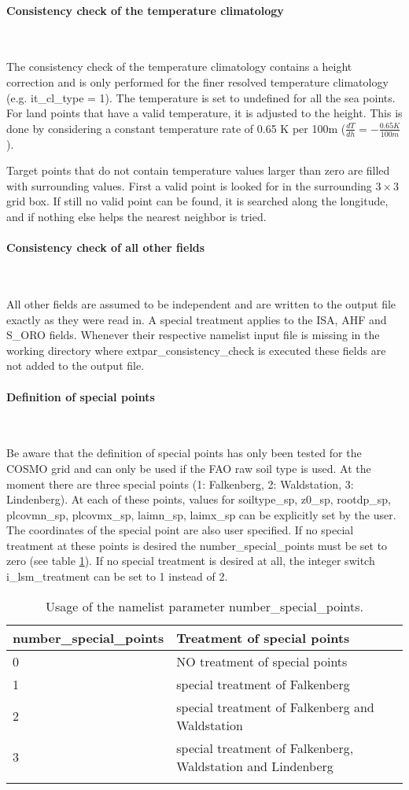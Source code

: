 \documentclass[a4paper,10pt,DIV14,BCOR1cm,titlepage,twoside]{scrartcl}
\providecommand{\tabularnewline}{\\}
\begin{document}
\paragraph{Consistency check of the temperature climatology}\ \par\medskip\noindent
The consistency check of the temperature climatology contains a height correction and is only performed for the finer resolved temperature climatology (e.g. it\_cl\_type = 1). The temperature is set to undefined for all the sea points. For land points that have a valid temperature, it is adjusted to the height. This is done by considering a constant temperature rate of 0.65 K per 100m ($\frac{dT}{dh} = -\frac{0.65 K}{100 m}$). \par\medskip\noindent
Target points that do not contain temperature values larger than zero are filled with surrounding values. First a valid point is looked for in the surrounding $3\times3$ grid box. If still no valid point can be found, it is searched along the longitude, and if nothing else helps the nearest neighbor is tried.
\paragraph{Consistency check of all other fields}\ \par\medskip\noindent
All other fields are assumed to be independent and are written to the output file exactly as they were read in. A special treatment applies to the ISA, AHF and S\_ORO fields. Whenever their respective namelist input file is missing in the working directory where extpar\_consistency\_check is executed these fields are not added to the output file. 
\paragraph{Definition of special points}\ \par\medskip\noindent
Be aware that the definition of special points has only been tested for the COSMO grid and can only be used if the FAO raw soil type is used. At the moment there are three special points (1: Falkenberg, 2: Waldstation, 3: Lindenberg). At each of these points, values for soiltype\_sp, z0\_sp, rootdp\_sp, plcovmn\_sp, plcovmx\_sp, laimn\_sp, laimx\_sp can be explicitly set by the user. The coordinates of the special point are also user specified. If no special treatment at these points is desired the number\_special\_points must be set to zero (see table \ref{tab:number_special_points}). If no special treatment is desired at all, the integer switch i\_lsm\_treatment can be set to 1 instead of 2. \par\medskip\noindent
\begin{longtable}{p{4.25cm}|p{10.25cm}}
\textbf{number\_special\_points} & \textbf{Treatment of special points}  \tabularnewline
\hline
\endhead
\hline
0 & NO treatment of special points \tabularnewline
1 & special treatment of Falkenberg \tabularnewline
2 & special treatment of Falkenberg and Waldstation \tabularnewline
3 & special treatment of Falkenberg, Waldstation and Lindenberg \tabularnewline
\bottomrule
\caption{Usage of the namelist parameter number\_special\_points.}
\label{tab:number_special_points}
\end{longtable}
\end{document}
